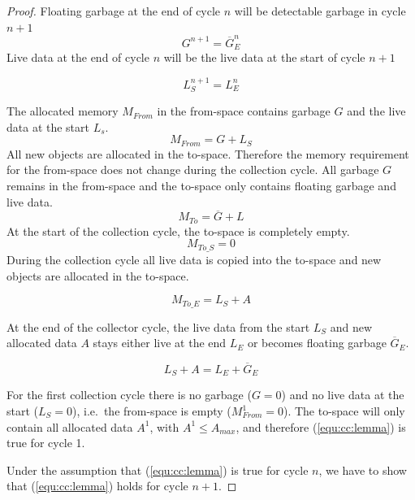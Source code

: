 \begin{proof}

Floating garbage at the end of cycle $n$ will be detectable garbage
in cycle $n+1$
%
\begin{equation}\label{equ:cc:flg}
    G^{n+1} = \overline{G}_E^n
\end{equation}
%
Live data at the end of cycle $n$ will be the live data at the start
of cycle $n+1$

\begin{equation}\label{equ:cc:ldata}
    L_S^{n+1} = L_E^{n}
\end{equation}


The allocated memory $M_{From}$ in the from-space contains garbage
$G$ and the live data at the start $L_s$.
%
\begin{equation}
    M_{From} = G + L_S
\end{equation}
%
All new objects are allocated in the to-space. Therefore the memory
requirement for the from-space does not change during the collection
cycle. All garbage $G$ remains in the from-space and the to-space
only contains floating garbage and live data.
%
\begin{equation}
    M_{To} = \overline{G} + L
\end{equation}
%
At the start of the collection cycle, the to-space is completely
empty.
%
\begin{equation}
    M_{To\_S} = 0
\end{equation}
%
During the collection cycle all live data is copied into the
to-space and new objects are allocated in the to-space.

\begin{equation}
    M_{To\_E} = L_S + A
\end{equation}

At the end of the collector cycle, the live data from the start $L_S$
and new allocated data $A$ stays either live at the end $L_E$ or
becomes floating garbage $\overline{G}_E$.

\begin{equation}
    L_S + A = L_E + \overline{G}_E
\end{equation}

For the first collection cycle there is no garbage ($G=0$) and no
live data at the start ($L_S=0$), i.e.\ the from-space is empty
($M_{From}^1=0$). The to-space will only contain all allocated data
$A^1$, with $A^1 \le A_{max}$, and therefore (\ref{equ:cc:lemma}) is
true for cycle 1.

Under the assumption that (\ref{equ:cc:lemma}) is true for cycle
$n$, we have to show that (\ref{equ:cc:lemma}) holds for cycle
$n+1$.


\end{proof}
